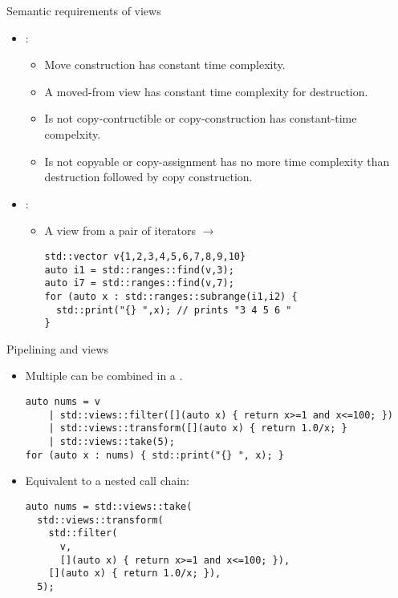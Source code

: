 \begin{frame}[t,fragile]{Semantic requirements of views}
\begin{itemize}
  \item {}:
    \begin{itemize}
      \item Move construction has constant time complexity.
      \item A moved-from view has constant time complexity for destruction.
      \item Is not copy-contructible or copy-construction has constant-time
            compelxity.
      \item Is not copyable or copy-assignment has no more time complexity
            than destruction followed by copy construction.
    \end{itemize}

  \item {}:
    \begin{itemize}
      \item A view from a pair of iterators $\rightarrow$
\begin{lstlisting}
std::vector v{1,2,3,4,5,6,7,8,9,10}
auto i1 = std::ranges::find(v,3);
auto i7 = std::ranges::find(v,7);
for (auto x : std::ranges::subrange(i1,i2) {
  std::print("{} ",x); // prints "3 4 5 6 "
}
\end{lstlisting}

    \end{itemize}
\end{itemize}
\end{frame}

\begin{frame}[t,fragile]{Pipelining and views}
\begin{itemize}
  \item Multiple  can be combined in a
        .
\begin{lstlisting}
auto nums = v 
    | std::views::filter([](auto x) { return x>=1 and x<=100; }) 
    | std::views::transform([](auto x) { return 1.0/x; }
    | std::views::take(5);
for (auto x : nums) { std::print("{} ", x); }
\end{lstlisting}

  \item Equivalent to a nested call chain:
\begin{lstlisting}
auto nums = std::views::take(
  std::views::transform(
    std::filter(
      v,
      [](auto x) { return x>=1 and x<=100; }),      
    [](auto x) { return 1.0/x; }),
  5);
\end{lstlisting}
\end{itemize}
\end{frame}
